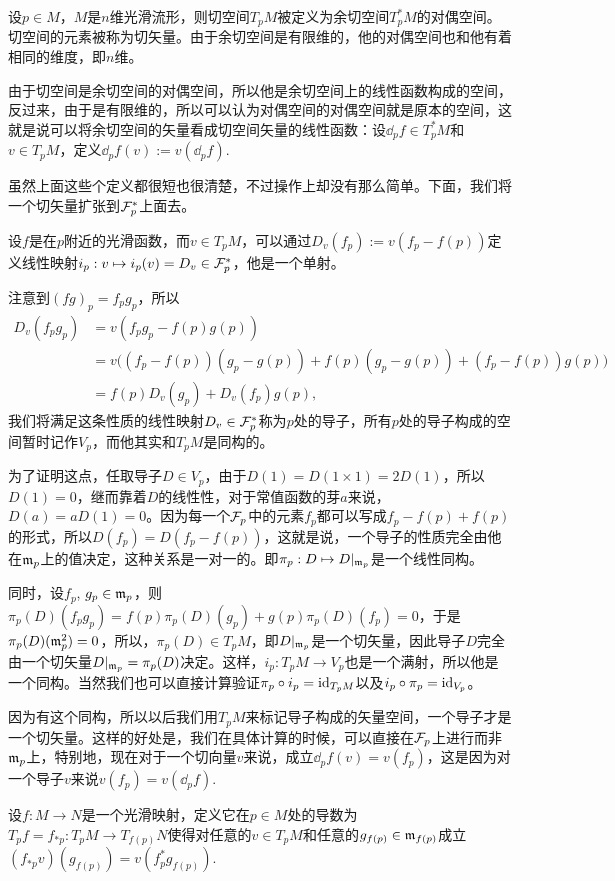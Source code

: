 \para 设$p\in M$，$M$是$n$维光滑流形，则{\kaishu 切空间}$T_pM$被定义为余切空间$T_p^*M$的对偶空间。切空间的元素被称为{\kaishu 切矢量}。由于余切空间是有限维的，他的对偶空间也和他有着相同的维度，即$n$维。

\para 由于切空间是余切空间的对偶空间，所以他是余切空间上的线性函数构成的空间，反过来，由于是有限维的，所以可以认为对偶空间的对偶空间就是原本的空间，这就是说可以将余切空间的矢量看成切空间矢量的线性函数：设$\dd_p f\in T_p^*M$和$v\in T_pM$，定义$\dd_p f(v):=v(\dd_p f)$.

虽然上面这些个定义都很短也很清楚，不过操作上却没有那么简单。下面，我们将一个切矢量扩张到$\mathcal{F}_p^*$上面去。

\para 设$f$是在$p$附近的光滑函数，而$v\in T_pM$，可以通过$D_v(f_p):=v(f_p-f(p))$定义线性映射$i_p:v\mapsto i_p(v)=D_v\in \mathcal{F}_p^*$，他是一个单射。

注意到$(fg)_p=f_pg_p$，所以
\begin{align*}
	D_v(f_pg_p)&=v(f_pg_p-f(p)g(p))\\
	&=v\bigl((f_p-f(p))(g_p-g(p))+f(p)(g_p-g(p))+(f_p-f(p))g(p)\bigr)\\
	&=f(p)D_v(g_p)+D_v(f_p)g(p),
\end{align*}
我们将满足这条性质的线性映射$D_v\in \mathcal{F}_p^*$称为$p$处的导子，所有$p$处的导子构成的空间暂时记作$V_p$，而他其实和$T_pM$是同构的。

为了证明这点，任取导子$D\in V_p$，由于$D(1)=D(1\times 1)=2D(1)$，所以$D(1)=0$，继而靠着$D$的线性性，对于常值函数的芽$a$来说，$D(a)=aD(1)=0$。因为每一个$\mathcal{F}_p$中的元素$f_p$都可以写成$f_p-f(p)+f(p)$的形式，所以$D(f_p)=D(f_p-f(p))$，这就是说，一个导子的性质完全由他在$\mathfrak{m}_p$上的值决定，这种关系是一对一的。即$\pi_p:D\mapsto D|_{\mathfrak{m}_p}$是一个线性同构。

同时，设$f_p$, $g_p\in \mathfrak{m}_p$，则$\pi_p(D)(f_pg_p)=f(p)\pi_p(D)(g_p)+g(p)\pi_p(D)(f_p)=0$，于是$\pi_p(D)(\mathfrak{m}_p^2)=0$，所以，$\pi_p(D)\in T_pM$，即$D|_{\mathfrak{m}_p}$是一个切矢量，因此导子$D$完全由一个切矢量$D|_{\mathfrak{m}_p}=\pi_p(D)$决定。这样，$i_p:T_pM\to V_p$也是一个满射，所以他是一个同构。当然我们也可以直接计算验证$\pi_p\circ i_p=\operatorname{id}_{T_pM}$以及$i_p\circ \pi_p=\operatorname{id}_{V_p}$。

因为有这个同构，所以以后我们用$T_pM$来标记导子构成的矢量空间，一个导子才是一个切矢量。这样的好处是，我们在具体计算的时候，可以直接在$\mathcal{F}_p$上进行而非$\mathfrak{m}_p$上，特别地，现在对于一个切向量$v$来说，成立$\dd_pf(v)=v(f_p)$，这是因为对一个导子$v$来说$v(f_p)=v(\dd_pf)$.

\para 设$f:M\to N$是一个光滑映射，定义它在$p\in M$处的导数为$T_pf=f_{*p}:T_pM\to T_{f(p)}N$使得对任意的$v\in T_p M$和任意的$g_{f(p)}\in \mathfrak{m}_{f(p)}$成立$(f_{*p}v)(g_{f(p)})=v(f_p^*g_{f(p)})$.

